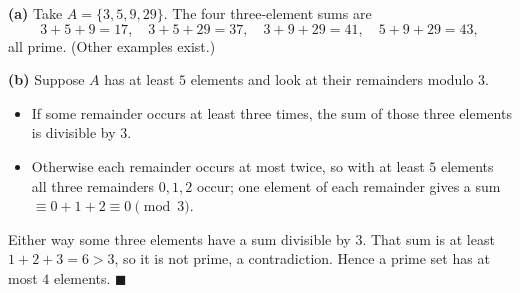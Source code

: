 \textbf{(a)} Take \(A=\{3,5,9,29\}\). The four three-element sums are
\[
3+5+9=17,\quad 3+5+29=37,\quad 3+9+29=41,\quad 5+9+29=43,
\]
all prime. (Other examples exist.)

\textbf{(b)} Suppose \(A\) has at least \(5\) elements and look at their remainders modulo \(3\).
\begin{itemize}
\item If some remainder occurs at least three times, the sum of those three elements is divisible by \(3\).
\item Otherwise each remainder occurs at most twice, so with at least \(5\) elements all three remainders \(0,1,2\) occur; one element of each remainder gives a sum \(\equiv0+1+2\equiv0\pmod3\).
\end{itemize}
Either way some three elements have a sum divisible by \(3\). That sum is at least \(1+2+3=6>3\), so it is not prime, a contradiction. Hence a prime set has at most \(4\) elements. \(\blacksquare\)
